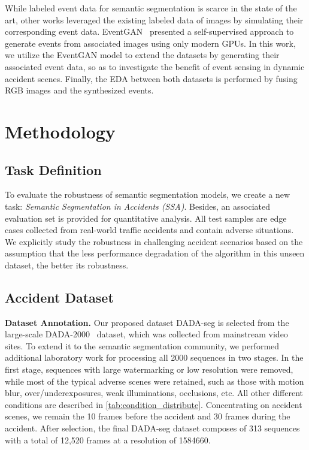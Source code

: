 \documentclass[letterpaper, 10 pt, conference]{ieeeconf}
\begin{document}
While labeled event data for semantic segmentation is scarce in the state of the art, other works leveraged the existing labeled data of images by simulating their corresponding event data.
EventGAN~\cite{zhu2019eventgan} presented a self-supervised approach to generate events from associated images using only modern GPUs. In this work, we utilize the EventGAN model to extend the datasets by generating their associated event data, so as to investigate the benefit of event sensing in dynamic accident scenes. Finally, the EDA between both datasets is performed by fusing RGB images and the synthesized events.


\section{Methodology}

\subsection{Task Definition}\label{method:task_definition}
To evaluate the robustness of semantic segmentation models, we create a new task: \textit{Semantic Segmentation in Accidents (SSA)}. Besides, an associated evaluation set is provided for quantitative analysis. All test samples are edge cases collected from real-world traffic accidents and contain adverse situations. We explicitly study the robustness in challenging accident scenarios based on the assumption that the less performance degradation of the algorithm in this unseen dataset, the better its robustness. 

\subsection{Accident Dataset}\label{method:dataset}
\textbf{Dataset Annotation.} Our proposed dataset DADA-seg is selected from the large-scale DADA-2000~\cite{conf/ieeeits/FangYQXWL19_DADA} dataset, which was collected from mainstream video sites. To extend it to the semantic segmentation community, we performed additional laboratory work for processing all 2000 sequences in two stages. In the first stage, sequences with large watermarking or low resolution were removed, while most of the typical adverse scenes were retained, such as those with motion blur, over/underexposures, weak illuminations, occlusions, etc. All other different conditions are described in \cref{tab:condition_distribute}. Concentrating on accident scenes, we remain the 10 frames before the accident and 30 frames during the accident. After selection, the final DADA-seg dataset composes of 313 sequences with a total of 12,520 frames at a resolution of 1584660. 
\end{document}
